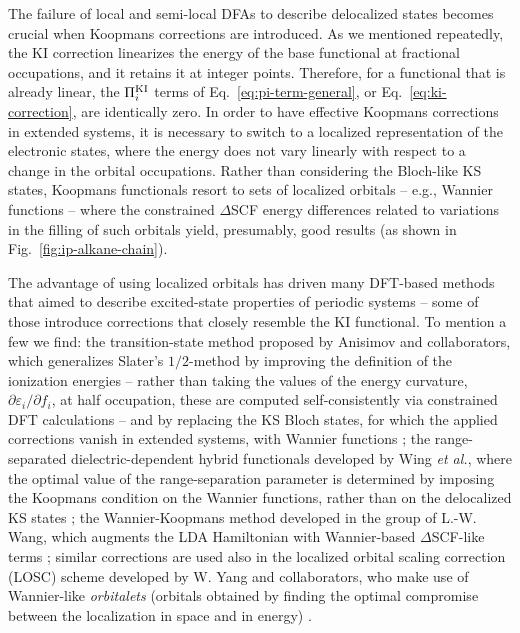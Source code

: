 The failure of local and semi-local DFAs to describe delocalized states becomes crucial when Koopmans corrections are introduced. As we mentioned repeatedly, the KI correction linearizes the energy of the base functional at fractional occupations, and it retains it at integer points. Therefore, for a functional that is already linear, the $\Pi_i^{\rm KI}$ terms of Eq.~\eqref{eq:pi-term-general}, or Eq.~\eqref{eq:ki-correction}, are identically zero. In order to have effective Koopmans corrections in extended systems, it is necessary to switch to a localized representation of the electronic states, where the energy does not vary linearly with respect to a change in the orbital occupations. Rather than considering the Bloch-like KS states, Koopmans functionals resort to sets of localized orbitals -- e.g., Wannier functions -- where the constrained $\Delta$SCF energy differences related to variations in the filling of such orbitals yield, presumably, good results (as shown in Fig.~\ref{fig:ip-alkane-chain}).

The advantage of using localized orbitals has driven many DFT-based methods that aimed to describe excited-state properties of periodic systems -- some of those introduce corrections that closely resemble the KI functional. To mention a few we find: the transition-state method proposed by Anisimov and collaborators, which generalizes Slater's $1/2$-method by improving the definition of the ionization energies -- rather than taking the values of the energy curvature, $\partial \varepsilon_i / \partial f_i$, at half occupation, these are computed self-consistently via constrained DFT calculations -- and by replacing the KS Bloch states, for which the applied corrections vanish in extended systems, with Wannier functions \cite{anisimov_transition_2005,anisimov_orbital_2007}; the range-separated dielectric-dependent hybrid functionals developed by Wing \emph{et al.}, where the optimal value of the range-separation parameter is determined by imposing the Koopmans condition on the Wannier functions, rather than on the delocalized KS states \cite{wing_band_2021}; the Wannier-Koopmans method developed in the group of L.-W. Wang, which augments the LDA Hamiltonian with Wannier-based $\Delta$SCF-like terms \cite{ma_using_2016,ma_energy_2016,weng_wannier_2017,weng_wannier_2018,li_wannier-koopmans_2018,weng_wannierkoopmans_2020}; similar corrections are used also in the localized orbital scaling correction (LOSC) scheme developed by W. Yang and collaborators, who make use of Wannier-like \emph{orbitalets} (orbitals obtained by finding the optimal compromise between the localization in space and in energy) \cite{li_localized_2018,mei_libsc_2021,mahler_wannier_2022}.

